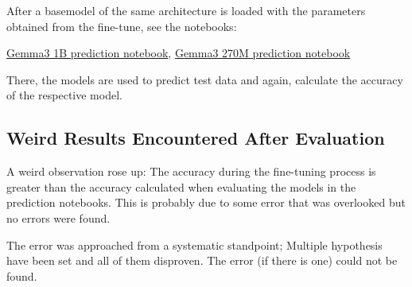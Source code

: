 \documentclass{article}
\begin{document}
After a basemodel of the same architecture is loaded with the parameters 
obtained from the fine-tune, see the notebooks: 

\href{https://github.com/AntonStantan/matura/blob/main/pre-trained-tranformers/big_gemma_huggingface_predict.ipynb}{Gemma3 1B prediction notebook}, 
\href{https://github.com/AntonStantan/matura/blob/main/pre-trained-tranformers/gemma-huggingface-predict.ipynb}{Gemma3 270M prediction notebook}

There, the models are used to predict test data and again, calculate the 
accuracy of the respective model.

\subsection{Weird Results Encountered After Evaluation}

A weird observation rose up: The accuracy during the fine-tuning process is 
greater than the accuracy calculated when evaluating the models in the 
prediction notebooks. This is probably due to some error that was overlooked 
but no errors were found.

The error was approached from a systematic standpoint; Multiple hypothesis 
have been set and all of them disproven. The error (if there is one) could 
not be found.
\end{document}

